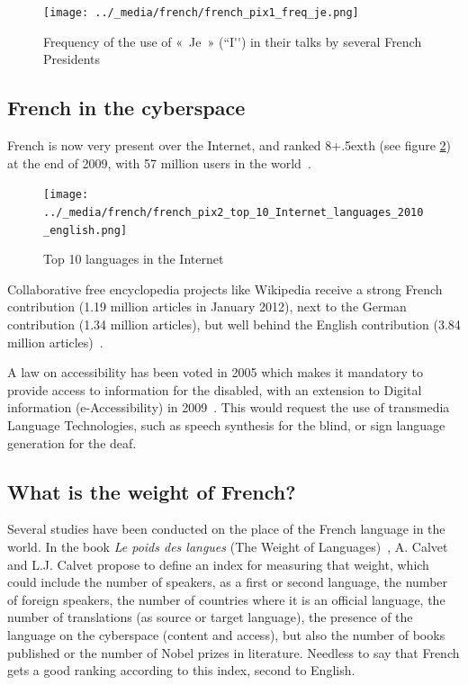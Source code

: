 \begin{multicols}{2}
\begin{figure}[!ht]
\begin{center}
 \texttt{[image: ../\_media/french/french\_pix1\_freq\_je.png]} 
  \caption{Frequency of the use of «~Je~» (``I{\mbox '}{\mbox '}) in their talks by several French Presidents}
  \label{fig:je_stats_en}
\end{center}
\end{figure}

\subsection{French in the cyberspace}

French is now very present over the Internet, and ranked
8\raise+.5ex\hbox{th} (see figure \ref{fig:internettop10_en}) at the end
of 2009, with 57 million users in the world~\cite{internettop10}.

\begin{figure}[!ht]
\begin{center}
 \texttt{[image: ../\_media/french/french\_pix2\_top\_10\_Internet\_languages\_2010\_english.png]}
  \caption{Top 10 languages in the Internet~\cite{internettop10}}
  \label{fig:internettop10_en}
\end{center}
\end{figure}

Collaborative free encyclopedia projects like Wikipedia receive a
strong French contribution (1.19 million articles in January 2012),
next to the German contribution (1.34 million articles), but well behind the English contribution (3.84 million articles)~\cite{wikipediastats}.

A law on accessibility has been voted in 2005 which makes it mandatory
to provide access to information for the disabled, with an extension
to Digital information (e-Accessibility) in 2009~\cite{loi}. This would request
the use of transmedia Language Technologies, such as speech synthesis
for the blind, or sign language generation for the deaf.

\subsection{What is the weight of French?}

Several studies have been conducted on the place of the French
language in the world. In the book {\em Le poids des
langues} (The Weight of Languages)~\cite{calvet09}, A. Calvet and
L.J. Calvet propose to define an index for measuring that weight,
which could include the number of speakers, as a first or second
language, the number of foreign speakers, the number of countries
where it is an official language, the number of translations (as
source or target language), the presence of the language on the
cyberspace (content and access), but also the number of books
published or the number of Nobel prizes in literature. Needless to say
that French gets a good ranking according to this index, second to
English.


\end{multicols}
